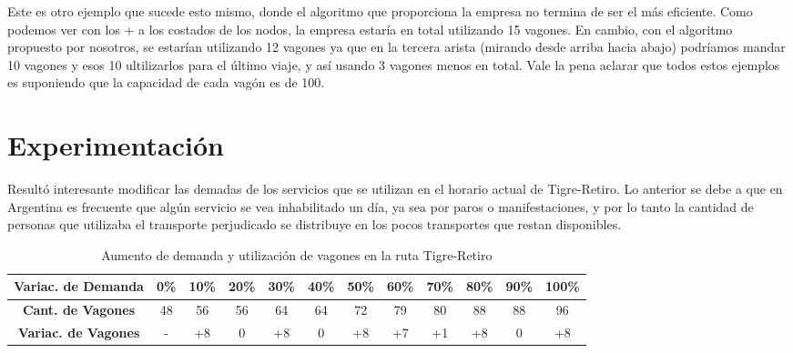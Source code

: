 \documentclass{article}
\begin{document}
Este es otro ejemplo que sucede esto mismo, donde el algoritmo que proporciona la empresa no termina de ser el más eficiente. Como podemos ver con los +  a los costados de los nodos, la empresa estaría en total utilizando 15 vagones. En cambio, con el algoritmo propuesto por nosotros, se estarían utilizando 12 vagones ya que en la tercera arista (mirando desde arriba hacia abajo) podríamos mandar 10 vagones y esos 10 ultilizarlos para el último viaje, y así usando 3 vagones menos en total. Vale la pena aclarar que todos estos ejemplos es suponiendo que la capacidad de cada vagón es de 100.
    

\vspace{2cm}

\section{Experimentación}
\vspace{0.5cm}
       Resultó interesante modificar las demadas de los servicios que se utilizan en el horario actual de Tigre-Retiro. Lo anterior se debe a que en Argentina es frecuente que algún servicio se vea inhabilitado un día, ya sea por paros o manifestaciones, y por lo tanto la cantidad de personas que utilizaba el transporte perjudicado se distribuye en los pocos transportes que restan disponibles. 

      \begin{table}[htbp]
        \centering
        \caption{Aumento de demanda y utilización de vagones en la ruta Tigre-Retiro}
        \begin{tabular}{|c||c|c|c|c|c|c|c|c|c|c|c|}
            \hline
            \textbf{Variac. de Demanda} & \textbf{0\%} & \textbf{10\%} & \textbf{20\%} & \textbf{30\%} & \textbf{40\%} & \textbf{50\%} & \textbf{60\%} & \textbf{70\%} & \textbf{80\%} & \textbf{90\%} & \textbf{100\%} \\
            \hline
            \textbf{Cant. de Vagones}   & 48           & 56           & 56           & 64           & 64           & 72           & 79           & 80           & 88           & 88           & 96            \\
            \hline
            \textbf{Variac. de Vagones}          & -            & +8           & 0            & +8           & 0            & +8           & +7           & +1           & +8           & 0            & +8            \\
            \hline
        \end{tabular}
    \end{table}
\end{document}
